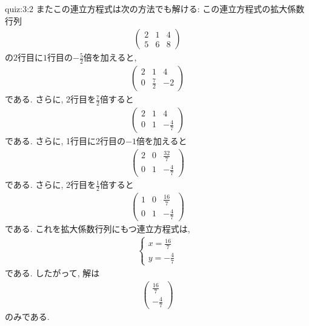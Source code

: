 \begin{answerof}{quiz:3:2}
  またこの連立方程式は次の方法でも解ける:
  この連立方程式の拡大係数行列
  \begin{align*}
    \begin{pmatrix}
      2&1&4\\5&6&8
    \end{pmatrix}
  \end{align*}
  の$2$行目に$1$行目の$-\frac{5}{2}$倍を加えると,
  \begin{align*}
    \begin{pmatrix}
      2&1&4\\0&\frac{7}{2}&-2
    \end{pmatrix}
  \end{align*}
  である. さらに,
  2行目を$\frac{7}{2}$倍すると
  \begin{align*}
    \begin{pmatrix}
      2&1&4\\0&1&-\frac{4}{7}
    \end{pmatrix}
  \end{align*}
  である. さらに,
  1行目に2行目の$-1$倍を加えると
  \begin{align*}
    \begin{pmatrix}
      2&0&\frac{32}{7}\\0&1&-\frac{4}{7}
    \end{pmatrix}
  \end{align*}
  である. さらに,
  2行目を$\frac{1}{2}$倍すると
  \begin{align*}
    \begin{pmatrix}
      1&0&\frac{16}{7}\\0&1&-\frac{4}{7}
    \end{pmatrix}
  \end{align*}
  である.
  これを拡大係数行列にもつ連立方程式は,
  \begin{align*}
    \begin{cases}
      x=\frac{16}{7}\\
      y=-\frac{4}{7}
    \end{cases}
  \end{align*}
  である. したがって,
  解は
  \begin{align*}
        \begin{pmatrix}
      \frac{16}{7}\\-\frac{4}{7}
    \end{pmatrix}
  \end{align*}
  のみである.
\end{answerof}
